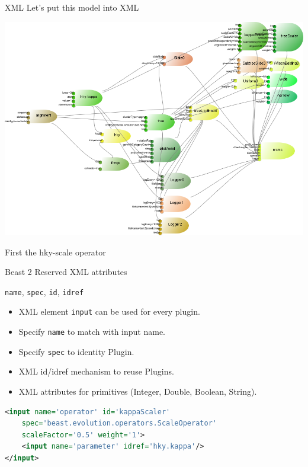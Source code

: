 \documentclass{beamer}
\theoremstyle{definition}
\begin{document}
\begin{frame}{XML}
Let's put this model into XML 

\includegraphics[width=\textwidth]{example5.png}

First the hky-scale operator

\end{frame}

\begin{frame}[containsverbatim]{Beast 2 Reserved XML attributes}

{\tt name}, {\tt spec}, {\tt id}, {\tt idref}
\begin{itemize}
\item XML element {\tt input} can be used for every plugin.
\item Specify {\tt name} to match with input name.
\item Specify {\tt spec} to identity Plugin.
\item XML id/idref mechanism to reuse Plugins.
\item XML attributes for primitives (Integer, Double, Boolean, String).
\end{itemize}

{\small
\begin{lstlisting}[language=XML]
<input name='operator' id='kappaScaler' 
    spec='beast.evolution.operators.ScaleOperator' 
    scaleFactor='0.5' weight='1'>
    <input name='parameter' idref='hky.kappa'/>
</input>
\end{lstlisting}
}
\end{frame}
\end{document}
